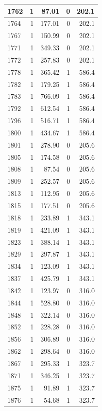 \documentclass[
  12pt,
]{book}
\begin{document}
\begin{tabular}{l|r|r|r|r}
\hline
1762 & 1 & 87.01 & 0 & 202.1\\
\hline
1764 & 1 & 177.01 & 0 & 202.1\\
\hline
1767 & 1 & 150.99 & 0 & 202.1\\
\hline
1771 & 1 & 349.33 & 0 & 202.1\\
\hline
1772 & 1 & 257.83 & 0 & 202.1\\
\hline
1778 & 1 & 365.42 & 1 & 586.4\\
\hline
1782 & 1 & 179.25 & 1 & 586.4\\
\hline
1783 & 1 & 766.09 & 1 & 586.4\\
\hline
1792 & 1 & 612.54 & 1 & 586.4\\
\hline
1796 & 1 & 516.71 & 1 & 586.4\\
\hline
1800 & 1 & 434.67 & 1 & 586.4\\
\hline
1801 & 1 & 278.90 & 0 & 205.6\\
\hline
1805 & 1 & 174.58 & 0 & 205.6\\
\hline
1808 & 1 & 87.54 & 0 & 205.6\\
\hline
1809 & 1 & 252.57 & 0 & 205.6\\
\hline
1813 & 1 & 112.95 & 0 & 205.6\\
\hline
1815 & 1 & 177.51 & 0 & 205.6\\
\hline
1818 & 1 & 233.89 & 1 & 343.1\\
\hline
1819 & 1 & 421.09 & 1 & 343.1\\
\hline
1823 & 1 & 388.14 & 1 & 343.1\\
\hline
1829 & 1 & 297.87 & 1 & 343.1\\
\hline
1834 & 1 & 123.09 & 1 & 343.1\\
\hline
1837 & 1 & 425.79 & 1 & 343.1\\
\hline
1842 & 1 & 123.97 & 0 & 316.0\\
\hline
1844 & 1 & 528.80 & 0 & 316.0\\
\hline
1848 & 1 & 322.14 & 0 & 316.0\\
\hline
1852 & 1 & 228.28 & 0 & 316.0\\
\hline
1856 & 1 & 306.89 & 0 & 316.0\\
\hline
1862 & 1 & 298.64 & 0 & 316.0\\
\hline
1867 & 1 & 295.33 & 1 & 323.7\\
\hline
1871 & 1 & 346.25 & 1 & 323.7\\
\hline
1875 & 1 & 91.89 & 1 & 323.7\\
\hline
1876 & 1 & 54.68 & 1 & 323.7\\

\end{tabular}
\end{document}
